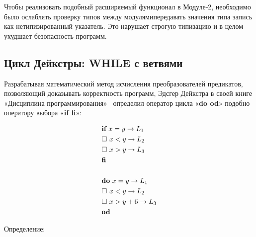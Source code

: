 \documentclass[utf8]{lgu}
\newcommand{\tire}{\unskip\nobreak\thinspace\textemdash\thinspace}
\begin{document}
Чтобы реализовать подобный расширяемый функционал в Модуле‑2, необходимо было ослаблять проверку типов между модулями\tire передавать значения типа запись как нетипизированный указатель. Это нарушает строгую типизацию и в целом ухудшает безопасность программ.

\subsection{Цикл Дейкстры: WHILE с ветвями}

\firstparskip Разрабатывая математический метод исчисления преобразователей предикатов, позволяющий доказывать корректность программ, Эдсгер Дейкстра в своей книге «Дисциплина программирования»~\cite[с.~32]{Discip} определил оператор цикла «\textbf{do od}» подобно оператору выбора «\textbf{if fi}»:

\begin{align}
    &\textbf{if}\ x=y \to L_1 \notag \\
    &\square\ x<y \to L_2 \\
    &\square\ x>y \to L_3 \notag \\
    &\textbf{fi} \notag \\
    \notag \\
    &\textbf{do}\ x=y \to L_1 \notag \\
    &\square\ x<y \to L_2 \\
    &\square\ x>y+6 \to L_3 \notag \\
    &\textbf{od} \notag
\end{align}

\noindent Определение:
\begin{equation}
\end{equation}
\vspace*{-7mm}
\end{document}

